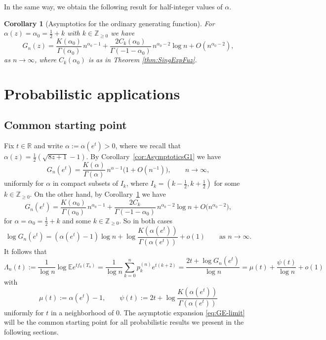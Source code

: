 \documentclass[11pt,a4paper]{article}
\numberwithin{equation}{section}
\newtheorem {corollary}[theorem]{Corollary}
\def\EE{\mathbb{E}}
\def\RR{\mathbb{R}}
\def\ZZ{\mathbb{Z}}
\begin{document}
In the same way, we obtain the following result for half-integer values of $\alpha$.

\begin{corollary}[Asymptotics for the ordinary generating function]\label{cor:AsymptoticsG2}
For $\alpha(z)=\alpha_0=\tfrac12+k$ with $k\in\ZZ_{\geq 0}$ we have
\begin{equation*}
G_n(z)
=\frac{K(\alpha_0)}{\Gamma(\alpha_0)}\,n^{\alpha_0-1}
  + \frac{2C_k(\alpha_0)}{\Gamma(-1-\alpha_0)}\,n^{\alpha_0-2}\log n
  + O(n^{\alpha_0-2}),
\end{equation*}
as $n\to\infty$, where $C_k(\alpha_0)$ is as in Theorem \ref{thm:SingExpFuz}.
\end{corollary}



\section{Probabilistic applications}\label{sec:Applications}

\subsection{Common starting point}\label{sec:StartingPoint}

Fix $t\in\RR$ and write $\alpha:=\alpha(e^t)>0$, where we recall that $\alpha(z)=\tfrac{1}{2}(\sqrt{8z+1}-1)$. By Corollary~\ref{cor:AsymptoticsG1} we have
\begin{equation*}
G_n(e^t)
= \frac{K(\alpha)}{\Gamma(\alpha)}\,n^{\alpha-1}
\Big(1+O(n^{-1})\Big),
\qquad n\to\infty,
\end{equation*}
uniformly for $\alpha$ in compact subsets of $I_k$, where $I_k=(k-\tfrac{1}{2},k+\tfrac{1}{2})$ for some $k\in\ZZ_{\geq 0}$.
On the other hand, by Corollary~\ref{cor:AsymptoticsG2} we have
\begin{equation*}
G_n(e^t)
=\frac{K(\alpha_0)}{\Gamma(\alpha_0)}\,n^{\alpha_0-1}
  + \frac{2C_k}{\Gamma(-1-\alpha_0)}\,n^{\alpha_0-2}\log n
  + O\bigl(n^{\alpha_0-2}\bigr),
\end{equation*}
for $\alpha=\alpha_0=\tfrac{1}{2}+k$ and some $k\in\ZZ_{\geq 0}$. So in both cases
\begin{equation*}
\log G_n(e^t)
= (\alpha(e^t)-1)\log n + \log\!\frac{K(\alpha(e^t))}{\Gamma(\alpha(e^t))} + o(1) \qquad \text{as $n\to\infty$}.
\end{equation*}
It follows that
\begin{equation}\label{eq:GE-limit}
\Lambda_n(t):=\frac{1}{\log n}\log \EE e^{tf_0(T_n)} = \frac{1}{\log n} \sum_{k=0}^n p_k^{(n)} e^{t(k+2)} = \frac{2t+\log G_n(e^t)}{\log n}
= \mu(t) + \frac{\psi(t)}{\log n}+o(1)
\end{equation}
with
$$
\mu(t):=\alpha(e^t)-1,\qquad
\psi(t):=2t + \log\!\frac{K(\alpha(e^t))}{\Gamma(\alpha(e^t))}
$$
uniformly for $t$ in a neighborhood of $0$. The asymptotic expansion \eqref{eq:GE-limit} will be the common starting point for all probabilistic results we present in the following sections. 
\end{document}
